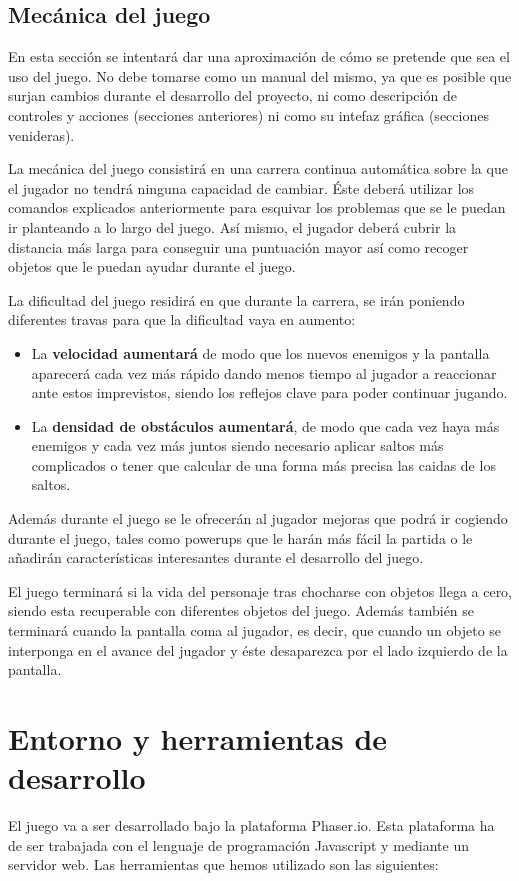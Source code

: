 \documentclass[palatino]{apuntes}
\begin{document}
\begin{itemize}
\subsection{Mecánica del juego}
En esta sección se intentará dar una aproximación de cómo se pretende que sea el uso del juego. No debe tomarse como un manual del mismo, ya que es posible que surjan cambios durante el desarrollo del proyecto, ni como descripción de controles y acciones (secciones anteriores) ni como su intefaz gráfica (secciones venideras).

La mecánica del juego consistirá en una carrera continua automática sobre la que el jugador no tendrá ninguna capacidad de cambiar. Éste deberá utilizar los comandos explicados anteriormente para esquivar los problemas que se le puedan ir planteando a lo largo del juego. Así mismo, el jugador deberá cubrir la distancia más larga para conseguir una puntuación mayor así como recoger objetos que le puedan ayudar durante el juego.

La dificultad del juego residirá en que durante la carrera, se irán poniendo diferentes travas para que la dificultad vaya en aumento:

\begin{itemize}
    \item La \textbf{velocidad aumentará} de modo que los nuevos enemigos y la pantalla aparecerá cada vez más rápido dando menos tiempo al jugador a reaccionar ante estos imprevistos, siendo los reflejos clave para poder continuar jugando.
    \item La \textbf{densidad de obstáculos aumentará}, de modo que cada vez haya más enemigos y cada vez más juntos siendo necesario aplicar saltos más complicados o tener que calcular de una forma más precisa las caidas de los saltos.
\end{itemize}

Además durante el juego se le ofrecerán al jugador mejoras que podrá ir cogiendo durante el juego, tales como powerups que le harán más fácil la partida o le añadirán características interesantes durante el desarrollo del juego.

El juego terminará si la vida del personaje tras chocharse con objetos llega a cero, siendo esta recuperable con diferentes objetos del juego. Además también se terminará cuando la pantalla coma al jugador, es decir, que cuando un objeto se interponga en el avance del jugador y éste desaparezca por el lado izquierdo de la pantalla.


\section {Entorno y herramientas de desarrollo}
El juego va a ser desarrollado bajo la plataforma Phaser.io. Esta plataforma ha de ser trabajada con el lenguaje de programación Javascript y mediante un servidor web. Las herramientas que hemos utilizado son las siguientes:


\end{itemize}
\end{document}
